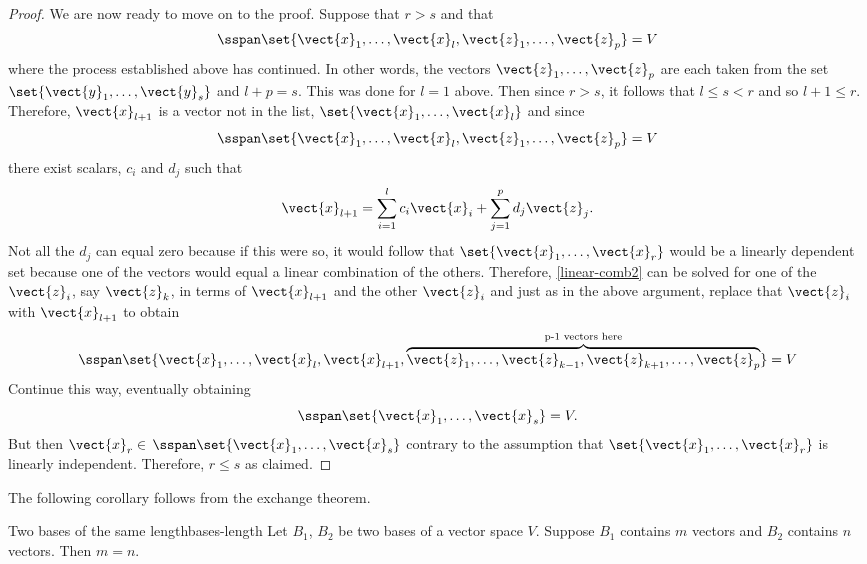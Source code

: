 \begin{proof}
We are now ready to move on to the proof. Suppose that $r>s$ and that 
\[
\sspan\set{\vect{x}_{1},\ldots,
\vect{x}_{l},\vect{z}_{1},\ldots,\vect{z}_{p}} =V
\]
 where the process established above has continued. In other words, the vectors $\vect{z}_{1},\ldots,\vect{z}_{p}$ are each taken from the
set $\set{\vect{y}_{1},\ldots,\vect{y}_{s}} $ and $l+p=s$.
This was done for $l=1$ above. Then since $r>s$, it follows that $
l\leq s<r$ and so $l+1\leq r$. Therefore, $\vect{x}_{l+1}$ is a vector not
in the list, $\set{\vect{x}_{1},\ldots,\vect{x}_{l}} $ and
since 
\[
\sspan\set{\vect{x}_{1},\ldots,\vect{x}_{l},\vect{z}
_{1},\ldots,\vect{z}_{p}} =V
\]
 there exist scalars, $c_{i}$ and $
d_{j}$ such that 
\begin{equation}
\vect{x}_{l+1}=\sum_{i=1}^{l}c_{i}\vect{x}_{i}+\sum_{j=1}^{p}d_{j}
\vect{z}_{j}.  \label{linear-comb2}
\end{equation}
Not all the $d_{j}$ can equal zero because if this were so, it would follow
that $\set{\vect{x}_{1},\ldots,\vect{x}_{r}} $ would be a
linearly dependent set because one of the vectors would equal a linear
combination of the others. Therefore, {\eqref{linear-comb2}} can be solved for one of the 
$\vect{z}_{i}$, say $\vect{z}_{k}$, in terms of $\vect{x}_{l+1}$ and
the other $\vect{z}_{i}$ and just as in the above argument, replace that $
\vect{z}_{i}$ with $\vect{x}_{l+1}$ to obtain 
\begin{equation*}
\sspan\set{\vect{x}_{1},\ldots,\vect{x}_{l},\vect{x}_{l+1},
\overset{\text{p-1 vectors here}}{\overbrace{\vect{z}_{1},\ldots,\vect{z}
_{k-1},\vect{z}_{k+1},\ldots,\vect{z}_{p}}}} =V
\end{equation*}
Continue this way, eventually obtaining 
\begin{equation*}
\sspan\set{\vect{x}_{1},\ldots,\vect{x}_{s}} =V.
\end{equation*}
But then $\vect{x}_{r}\in $ $\sspan\set{\vect{x}_{1},\ldots,
\vect{x}_{s}} $ contrary to the assumption that $\set{\vect{x}
_{1},\ldots,\vect{x}_{r}} $ is linearly independent. Therefore, $
r\leq s$ as claimed.
\end{proof}

The following corollary follows from the exchange theorem.

\begin{corollary}{Two bases of the same length}{bases-length}
Let $B_1$, $B_2$ be two bases of a vector space $V$. Suppose $B_1$ contains $m$ vectors and $B_2$ contains $n$ vectors. Then $m = n$.
\end{corollary}

